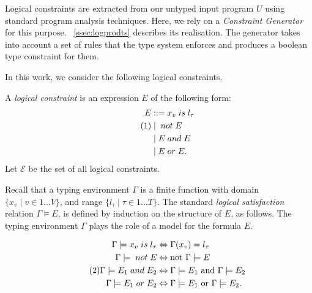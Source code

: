 \documentclass[acmsmall, review, anonymous]{acmart}\settopmatter{printfolios=true,printccs=false,printacmref=false}
\newcommand\numberthis{\addtocounter{equation}{1}\tag{\theequation}}
\begin{document}

Logical constraints are extracted from our untyped input program $U$ using
standard program analysis techniques.  Here, we rely on a \emph{Constraint
	Generator} for this purpose. ~\autoref{ssec:logprodts} describes its
realisation.  The generator takes into account a set of rules that the type system
enforces and produces a boolean type constraint for them.

In this work, we consider the following logical constraints.
\begin{definition}\label{def:log-gram}
	A \emph{logical constraint} is an expression $E$ of the following form:
	\begin{align*}
		E & ::= x_v \mathrel{is} l_\tau \\ \numberthis\label{eq:gram}
		  & \mid{} \mathrel{not} E      \\
		  & \mid E \mathrel{and} E      \\
		  & \mid E \mathrel{or} E.
	\end{align*}
	Let $\mathcal{E}$ be the set of all logical constraints.
\end{definition}

Recall that a typing environment $\Gamma$ is a finite function
with domain $\{ x_v \mid v \in 1 \ldots V\}$, and range $\{ l_\tau \mid \tau \in 1 \dots T \}$.
%
The standard \emph{logical satisfaction} relation $\Gamma \models E$, is defined by induction on the structure of $E$, as follows.
%
The typing environment $\Gamma$ plays the role of a model for the formula $E$.

          \begin{align*} 
              \Gamma \models x_v \mathrel{is} l_\tau & \Leftrightarrow \Gamma(x_v)=l_\tau                                  \\
              \Gamma \models{} \mathrel{not} E       & \Leftrightarrow{} \mbox{not $\Gamma \models E$}                    \\ \numberthis \label{eq:logsat}
              \Gamma \models E_1 \mathrel{and} E_2   & \Leftrightarrow
              \mbox{$\Gamma \models E_1$ and $\Gamma \models E_2$} \\
              \Gamma \models E_1 \mathrel{or} E_2
                                                     & \Leftrightarrow
        \mbox{$\Gamma \models E_1$ or $\Gamma \models E_2$.}
          \end{align*}
\end{document}
